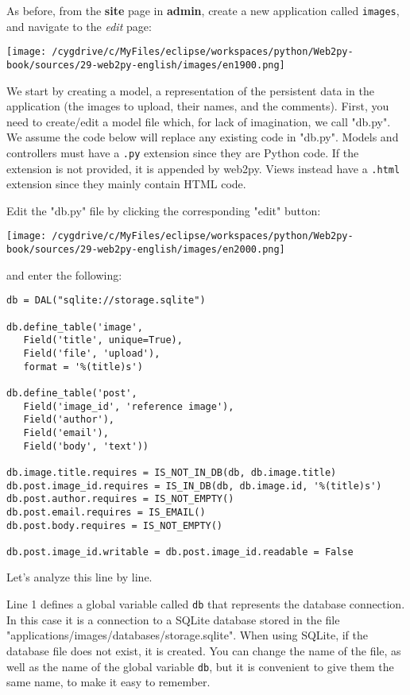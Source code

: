 \documentclass[justified,sixbynine,notoc]{tufte-book}
\def\ft{\small\tt}
\def\inxx#1{\index{#1}}
\begin{document}
\begin{fullwidth}
As before, from the {\bf site} page in {\bf admin}, create a new application called {\ft images}, and navigate to the {\it edit} page:


\goodbreak\begin{center}\texttt{[image: /cygdrive/c/MyFiles/eclipse/workspaces/python/Web2py-book/sources/29-web2py-english/images/en1900.png]}\end{center}


We start by creating a model, a representation of the persistent data in the application (the images to upload, their names, and the comments). First, you need to create/edit a model file which, for lack of imagination, we call "db.py". We assume the code below will replace any existing code in "db.py". Models and controllers must have a {\ft .py} extension since they are Python code. If the extension is not provided, it is appended by web2py. Views instead have a {\ft .html} extension since they mainly contain HTML code.

Edit the "db.py" file by clicking the corresponding "edit" button:


\goodbreak\begin{center}\texttt{[image: /cygdrive/c/MyFiles/eclipse/workspaces/python/Web2py-book/sources/29-web2py-english/images/en2000.png]}\end{center}

\noindent and enter the following:

\inxx{IS\_EMAIL} \inxx{IS\_NOT\_EMPTY} \inxx{IS\_IN\_DB}
\begin{lstlisting}
db = DAL("sqlite://storage.sqlite")

db.define_table('image',
   Field('title', unique=True),
   Field('file', 'upload'),
   format = '%(title)s')

db.define_table('post',
   Field('image_id', 'reference image'),
   Field('author'),
   Field('email'),
   Field('body', 'text'))

db.image.title.requires = IS_NOT_IN_DB(db, db.image.title)
db.post.image_id.requires = IS_IN_DB(db, db.image.id, '%(title)s')
db.post.author.requires = IS_NOT_EMPTY()
db.post.email.requires = IS_EMAIL()
db.post.body.requires = IS_NOT_EMPTY()

db.post.image_id.writable = db.post.image_id.readable = False
\end{lstlisting}

Let's analyze this line by line.

Line 1 defines a global variable called {\ft db} that represents the database connection. In this case it is a connection to a SQLite database stored in the file  "applications/images/databases/storage.sqlite". When using SQLite, if the database file does not exist, it is created. You can change the name of the file, as well as the name of the global variable {\ft db}, but it is convenient to give them the same name, to make it easy to remember.


\end{fullwidth}
\end{document}
